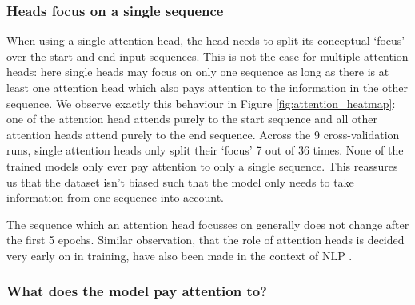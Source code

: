 

\subsubsection{Heads focus on a single sequence} 
When using a single attention head, the head needs to split its conceptual `focus' over the start and end input sequences. This is not the case for multiple attention heads: here single heads may focus on only one sequence as long as there is at least one attention head which also pays attention to the information in the other sequence. We observe exactly this behaviour in Figure \ref{fig:attention_heatmap}: one of the attention head attends purely to the start sequence and all other attention heads attend purely to the end sequence. Across the 9 cross-validation runs, single attention heads only split their `focus' 7 out of 36 times. None of the trained models only ever pay attention to only a single sequence. This reassures us that the dataset isn't biased such that the model only needs to take information from one sequence into account. 

The sequence which an attention head focusses on generally does not change after the first 5 epochs. Similar observation, that the role of attention heads is decided very early on in training, have also been made in the context of NLP \cite{sixteenheads}.

\subsubsection{What does the model pay attention to?}

